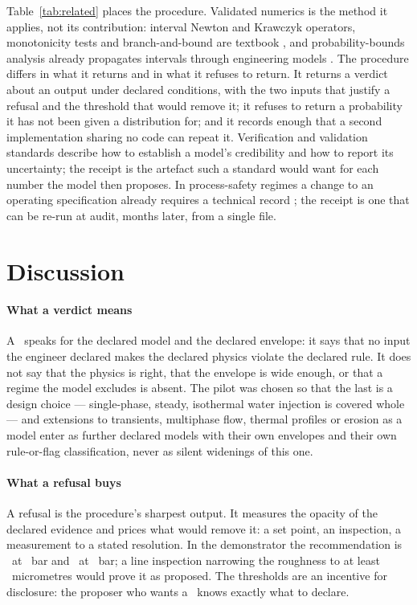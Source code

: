 \documentclass[preprint,11pt,authoryear]{elsarticle}
\begin{document}
Table~\ref{tab:related} places the procedure. Validated numerics is the method it applies, not its contribution: interval Newton and Krawczyk operators, monotonicity tests and branch-and-bound are textbook \citep{moore2009,hansen2004,tucker2011}, and probability-bounds analysis already propagates intervals through engineering models \citep{ferson1996}. The procedure differs in what it returns and in what it refuses to return. It returns a verdict about an output under declared conditions, with the two inputs that justify a refusal and the threshold that would remove it; it refuses to return a probability it has not been given a distribution for; and it records enough that a second implementation sharing no code can repeat it. Verification and validation standards \citep{asme2009,nasa2016} describe how to establish a model's credibility and how to report its uncertainty; the receipt is the artefact such a standard would want for each number the model then proposes. In process-safety regimes a change to an operating specification already requires a technical record \citep{anp2007}; the receipt is one that can be re-run at audit, months later, from a single file.

\section{Discussion}\label{sec:discussion}

\paragraph{What a verdict means}
A \vProved\ speaks for the declared model and the declared envelope: it says that no input the engineer declared makes the declared physics violate the declared rule. It does not say that the physics is right, that the envelope is wide enough, or that a regime the model excludes is absent. The pilot was chosen so that the last is a design choice --- single-phase, steady, isothermal water injection is covered whole --- and extensions to transients, multiphase flow, thermal profiles or erosion as a model enter as further declared models with their own envelopes and their own rule-or-flag classification, never as silent widenings of this one.

\paragraph{What a refusal buys}
A refusal is the procedure's sharpest output. It measures the opacity of the declared evidence and prices what would remove it: a set point, an inspection, a measurement to a stated resolution. In the demonstrator the recommendation is \vRefused\ at \GLeadPd\ bar and \vProved\ at \GFixedPd\ bar; a line inspection narrowing the roughness to at least \GFlipEps\ micrometres would prove it as proposed. The thresholds are an incentive for disclosure: the proposer who wants a \vProved\ knows exactly what to declare.
\end{document}
